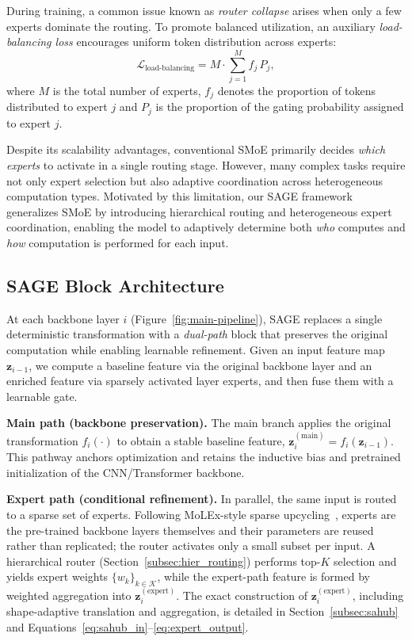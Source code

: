 During training, a common issue known as \textit{router collapse} arises when only a few experts dominate the routing. 
To promote balanced utilization, an auxiliary \textit{load-balancing loss} encourages uniform token distribution across experts:
\begin{equation}
\mathcal{L}_{\text{load-balancing}} = M \cdot \sum_{j=1}^{M} f_j \, P_j,
\label{eq:balance_loss}
\end{equation}
where $M$ is the total number of experts, $f_j$ denotes the proportion of tokens distributed to expert $j$ and $P_j$ is the proportion of the gating probability assigned to expert $j$. 

Despite its scalability advantages, conventional SMoE primarily decides \emph{which experts} to activate in a single routing stage.
However, many complex tasks require not only expert selection but also adaptive coordination across heterogeneous computation types.
Motivated by this limitation, our SAGE framework generalizes SMoE by introducing hierarchical routing and heterogeneous expert coordination, enabling the model to adaptively determine both \emph{who} computes and \emph{how} computation is performed for each input.


\subsection{SAGE Block Architecture}
\label{subsec:sage_block_archi}
At each backbone layer $i$ (Figure~\ref{fig:main-pipeline}), SAGE replaces a single deterministic transformation with a \emph{dual-path} block that preserves the original computation while enabling learnable refinement. Given an input feature map $\mathbf{z}_{i-1}$, we compute a baseline feature via the original backbone layer and an enriched feature via sparsely activated layer experts, and then fuse them with a learnable gate.

\noindent\textbf{Main path (backbone preservation).}
The main branch applies the original transformation $f_i(\cdot)$ to obtain a stable baseline feature, $\mathbf{z}_i^{(\text{main})} = f_i(\mathbf{z}_{i-1})$.
This pathway anchors optimization and retains the inductive bias and pretrained initialization of the CNN/Transformer backbone.

\noindent\textbf{Expert path (conditional refinement).}
In parallel, the same input is routed to a sparse set of experts. Following MoLEx-style sparse upcycling~\cite{molex}, experts are the pre-trained backbone layers themselves and their parameters are reused rather than replicated; the router activates only a small subset per input. A hierarchical router (Section~\ref{subsec:hier_routing}) performs top-$K$ selection and yields expert weights $\{w_k\}_{k\in\mathcal{K}}$, while the expert-path feature is formed by weighted aggregation into $\mathbf{z}_i^{(\text{expert})}$. The exact construction of $\mathbf{z}_i^{(\text{expert})}$, including shape-adaptive translation and aggregation, is detailed in Section~\ref{subsec:sahub} and Equations~\ref{eq:sahub_in}--\ref{eq:expert_output}. 

